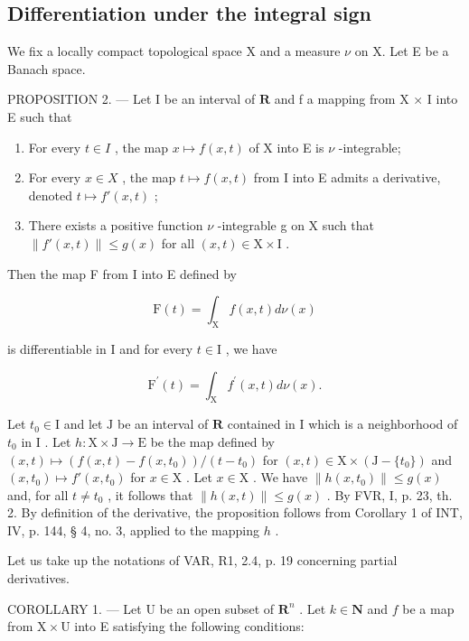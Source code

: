 \subsection{Differentiation under the integral sign}

We fix a locally compact topological space X and a measure \(\nu\) on X. Let E be a Banach space.

PROPOSITION 2. --- Let I be an interval of \(\mathbf{R}\) and f a mapping from X × I into E such that

\begin{enumerate}
\def\labelenumi{(\roman{enumi})}
\item
  For every \(t \in I\) , the map \(x \mapsto f(x, t)\) of X into E is \(\nu\) -integrable;
\item
  For every \(x \in X\) , the map \(t \mapsto f(x, t)\) from I into E admits a derivative, denoted \(t \mapsto f'(x, t)\) ;
\item
  There exists a positive function \(\nu\) -integrable g on X such that \(\|f'(x,t)\| \leqslant g(x)\) for all \((x,t) \in \mathrm{X} \times \mathrm{I}\) .
\end{enumerate}

Then the map F from I into E defined by

\[
\mathrm{F} (t) = \int_ {\mathrm{X}} f (x, t) d \nu (x)
\]

is differentiable in I and for every \(t \in \mathrm{I}\) , we have

\[
\mathrm{F} ^ {\prime} (t) = \int_ {\mathrm{X}} f ^ {\prime} (x, t) d \nu (x).
\]

Let \(t_0 \in \mathrm{I}\) and let \(\mathrm{J}\) be an interval of \(\mathbf{R}\) contained in \(\mathrm{I}\) which is a neighborhood of \(t_0\) in \(\mathrm{I}\) . Let \(h: \mathrm{X} \times \mathrm{J} \to \mathrm{E}\) be the map defined by \((x, t) \mapsto (f(x, t) - f(x, t_0)) / (t - t_0)\) for \((x, t) \in \mathrm{X} \times (\mathrm{J} - \{t_0\})\) and \((x, t_0) \mapsto f'(x, t_0)\) for \(x \in \mathrm{X}\) . Let \(x \in \mathrm{X}\) . We have \(\|h(x, t_0)\| \leqslant g(x)\) and, for all \(t \neq t_0\) , it follows that \(\|h(x, t)\| \leqslant g(x)\) . By FVR, I, p. 23, th. 2. By definition of the derivative, the proposition follows from Corollary 1 of INT, IV, p. 144, § 4, no. 3, applied to the mapping \(h\) .

Let us take up the notations of VAR, R1, 2.4, p. 19 concerning partial derivatives.

COROLLARY 1. --- Let U be an open subset of \(\mathbf{R}^{n}\) . Let \(k \in \mathbf{N}\) and \(f\) be a map from \(\mathrm{X} \times \mathrm{U}\) into E satisfying the following conditions:

